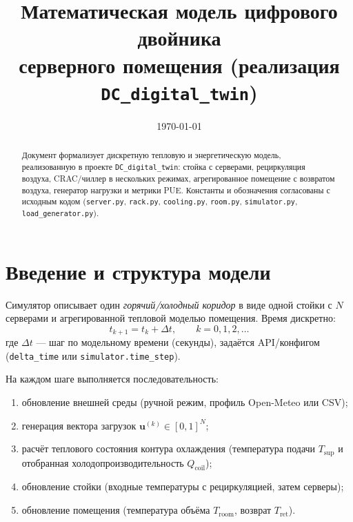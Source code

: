 \documentclass[12pt,a4paper]{article}
\title{Математическая модель цифрового двойника\\серверного помещения (реализация \texttt{DC\_digital\_twin})}
\author{}
\date{\today}
\begin{document}
\maketitle

\begin{abstract}
Документ формализует дискретную тепловую и энергетическую модель, реализованную в проекте
\texttt{DC\_digital\_twin}: стойка с серверами, рециркуляция воздуха, CRAC/чиллер в нескольких режимах,
агрегированное помещение с возвратом воздуха, генератор нагрузки и метрики PUE.
Константы и обозначения согласованы с исходным кодом (\texttt{server.py}, \texttt{rack.py},
\texttt{cooling.py}, \texttt{room.py}, \texttt{simulator.py}, \texttt{load\_generator.py}).
\end{abstract}

\tableofcontents
\newpage

\section{Введение и структура модели}

Симулятор описывает один \emph{горячий/холодный коридор} в виде одной стойки с $N$ серверами и
агрегированной тепловой моделью помещения. Время дискретно:
\begin{equation}
  t_{k+1} = t_k + \Delta t, \qquad k = 0,1,2,\ldots
\end{equation}
где $\Delta t$ --- шаг по модельному времени (секунды), задаётся API/конфигом (\texttt{delta\_time} или
\texttt{simulator.time\_step}).

На каждом шаге выполняется последовательность:
\begin{enumerate}[label=\arabic*.]
  \item обновление внешней среды (ручной режим, профиль Open-Meteo или CSV);
  \item генерация вектора загрузок $\mathbf{u}^{(k)} \in [0,1]^N$;
  \item расчёт теплового состояния контура охлаждения (температура подачи $T_{\mathrm{sup}}$ и
    отобранная холодопроизводительность $Q_{\mathrm{coil}}$);
  \item обновление стойки (входные температуры с рециркуляцией, затем серверы);
  \item обновление помещения (температура объёма $T_{\mathrm{room}}$, возврат $T_{\mathrm{ret}}$).
\end{enumerate}
\end{document}
